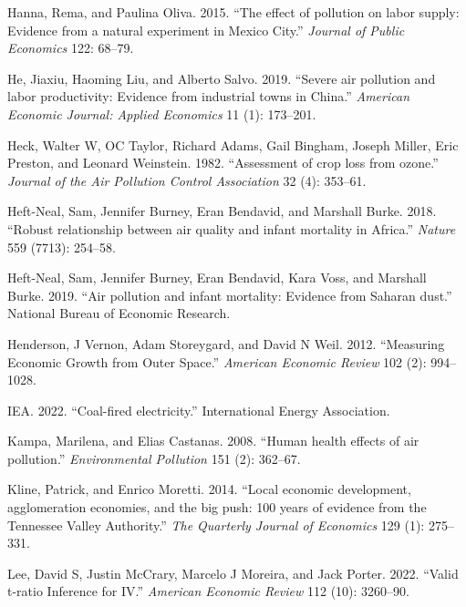 \documentclass[
]{article}
\newlength{\cslhangindent}
\newlength{\cslentryspacingunit} %
\newenvironment{CSLReferences}[2] %
 {%
  \setlength{\parindent}{0pt}
  \ifodd #1
  \let\oldpar\par
  \def\par{\hangindent=\cslhangindent\oldpar}
  \fi
  \setlength{\parskip}{#2\cslentryspacingunit}
 }%
 {}
\begin{document}
\begin{CSLReferences}{1}{0}
\leavevmode{}%
Hanna, Rema, and Paulina Oliva. 2015. {``{The effect of pollution on labor supply: Evidence from a natural experiment in Mexico City}.''} \emph{{Journal of Public Economics}} 122: 68--79.

\leavevmode{}%
He, Jiaxiu, Haoming Liu, and Alberto Salvo. 2019. {``{Severe air pollution and labor productivity: Evidence from industrial towns in China}.''} \emph{{American Economic Journal: Applied Economics}} 11 (1): 173--201.

\leavevmode{}%
Heck, Walter W, OC Taylor, Richard Adams, Gail Bingham, Joseph Miller, Eric Preston, and Leonard Weinstein. 1982. {``{Assessment of crop loss from ozone}.''} \emph{{Journal of the Air Pollution Control Association}} 32 (4): 353--61.

\leavevmode{}%
Heft-Neal, Sam, Jennifer Burney, Eran Bendavid, and Marshall Burke. 2018. {``{Robust relationship between air quality and infant mortality in Africa}.''} \emph{Nature} 559 (7713): 254--58.

\leavevmode{}%
Heft-Neal, Sam, Jennifer Burney, Eran Bendavid, Kara Voss, and Marshall Burke. 2019. {``{Air pollution and infant mortality: Evidence from Saharan dust}.''} {National Bureau of Economic Research}.

\leavevmode{}%
Henderson, J Vernon, Adam Storeygard, and David N Weil. 2012. {``Measuring Economic Growth from Outer Space.''} \emph{{American Economic Review}} 102 (2): 994--1028.

\leavevmode{}%
IEA. 2022. {``{Coal-fired electricity}.''} {International Energy Association}.

\leavevmode{}%
Kampa, Marilena, and Elias Castanas. 2008. {``{Human health effects of air pollution}.''} \emph{{Environmental Pollution}} 151 (2): 362--67.

\leavevmode{}%
Kline, Patrick, and Enrico Moretti. 2014. {``{Local economic development, agglomeration economies, and the big push: 100 years of evidence from the Tennessee Valley Authority}.''} \emph{The Quarterly Journal of Economics} 129 (1): 275--331.

\leavevmode{}%
Lee, David S, Justin McCrary, Marcelo J Moreira, and Jack Porter. 2022. {``{Valid t-ratio Inference for IV}.''} \emph{{American Economic Review}} 112 (10): 3260--90.


\end{CSLReferences}
\end{document}
